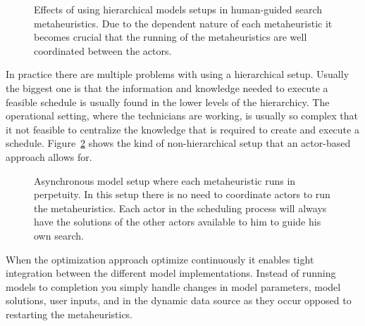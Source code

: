 \begin{figure}[H]
	\label{fig:discussion:hierarchical_model_setup}
	\caption{Effects of using hierarchical models setups in human-guided search metaheuristics.
	Due to the dependent nature of each metaheuristic it becomes crucial that the running of 
	the metaheuristics are well coordinated between the actors.}
\end{figure}

In practice there are multiple problems with using a hierarchical setup.
Usually the biggest one is that the information and knowledge needed to 
execute a feasible schedule is usually found in the lower levels of the 
hierarchicy. The operational setting, where the
technicians are working, is usually so complex that it not feasible to 
centralize the knowledge that is required to create and execute a 
schedule. Figure~\ref{fig:discussion:asynchronous_setup}
shows the kind of non-hierarchical setup that an actor-based approach 
allows for.

\begin{figure}[H]
	
	\caption{Asynchronous model setup where each metaheuristic runs in perpetuity. In this setup
		there is no need to coordinate actors to run the metaheuristics. Each actor in the 
		scheduling process will always have the solutions of the other actors available to 
		him to guide his own search.
	}\label{fig:discussion:asynchronous_setup}
\end{figure}

When the optimization approach optimize continuously it enables tight
integration between the different model implementations. Instead of running
models to completion you simply handle changes in model parameters, model
solutions, user inputs, and in the dynamic data source as they occur opposed to
restarting the metaheuristics.

